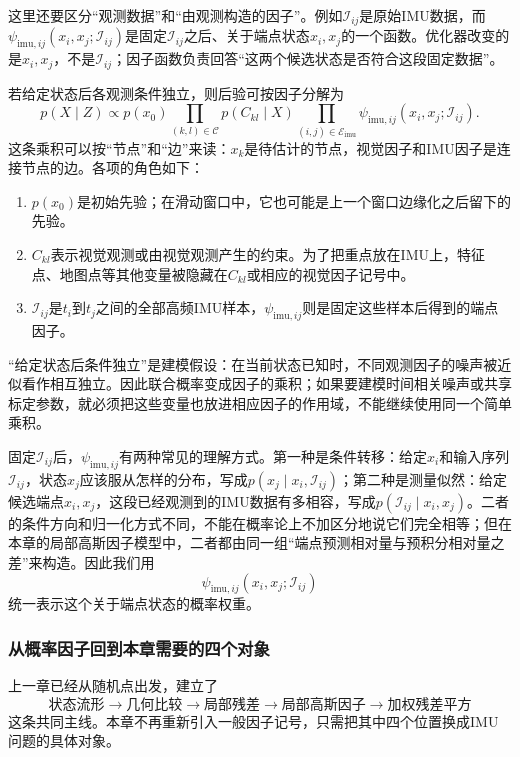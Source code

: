 这里还要区分“观测数据”和“由观测构造的因子”。例如$\mathcal I_{ij}$是原始IMU数据，而$\psi_{\mathrm{imu},ij}(x_i,x_j;\mathcal I_{ij})$是固定$\mathcal I_{ij}$之后、关于端点状态$x_i,x_j$的一个函数。优化器改变的是$x_i,x_j$，不是$\mathcal I_{ij}$；因子函数负责回答“这两个候选状态是否符合这段固定数据”。

若给定状态后各观测条件独立，则后验可按因子分解为
\[
    p(X\mid Z)
    \propto
    p(x_0)
    \prod_{(k,l)\in\mathcal C}p(C_{kl}\mid X)
    \prod_{(i,j)\in\mathcal E_{\mathrm{imu}}}
      \psi_{\mathrm{imu},ij}(x_i,x_j;\mathcal I_{ij}).
\]
这条乘积可以按“节点”和“边”来读：$x_k$是待估计的节点，视觉因子和IMU因子是连接节点的边。各项的角色如下：
\begin{enumerate}
    \item $p(x_0)$是初始先验；在滑动窗口中，它也可能是上一个窗口边缘化之后留下的先验。
    \item $C_{kl}$表示视觉观测或由视觉观测产生的约束。为了把重点放在IMU上，特征点、地图点等其他变量被隐藏在$C_{kl}$或相应的视觉因子记号中。
    \item $\mathcal I_{ij}$是$t_i$到$t_j$之间的全部高频IMU样本，$\psi_{\mathrm{imu},ij}$则是固定这些样本后得到的端点因子。
\end{enumerate}

“给定状态后条件独立”是建模假设：在当前状态已知时，不同观测因子的噪声被近似看作相互独立。因此联合概率变成因子的乘积；如果要建模时间相关噪声或共享标定参数，就必须把这些变量也放进相应因子的作用域，不能继续使用同一个简单乘积。

固定$\mathcal I_{ij}$后，$\psi_{\mathrm{imu},ij}$有两种常见的理解方式。第一种是条件转移：给定$x_i$和输入序列$\mathcal I_{ij}$，状态$x_j$应该服从怎样的分布，写成$p(x_j\mid x_i,\mathcal I_{ij})$；第二种是测量似然：给定候选端点$x_i,x_j$，这段已经观测到的IMU数据有多相容，写成$p(\mathcal I_{ij}\mid x_i,x_j)$。二者的条件方向和归一化方式不同，不能在概率论上不加区分地说它们完全相等；但在本章的局部高斯因子模型中，二者都由同一组“端点预测相对量与预积分相对量之差”来构造。因此我们用
\[
    \psi_{\mathrm{imu},ij}(x_i,x_j;\mathcal I_{ij})
\]
统一表示这个关于端点状态的概率权重。

\subsubsection{从概率因子回到本章需要的四个对象}

上一章已经从随机点出发，建立了
\[
    \text{状态流形}
    \longrightarrow
    \text{几何比较}
    \longrightarrow
    \text{局部残差}
    \longrightarrow
    \text{局部高斯因子}
    \longrightarrow
    \text{加权残差平方}
\]
这条共同主线。本章不再重新引入一般因子记号，只需把其中四个位置换成IMU问题的具体对象。

